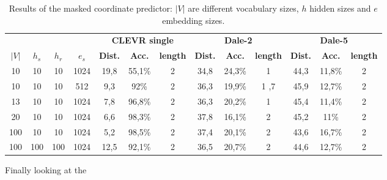 \begin{table}[h]
    \centering
    \begin{tabular}{cccc|ccc|ccc|ccc}
        \toprule
              &         &          &         & \multicolumn{3}{c}{\textbf{CLEVR single}} & \multicolumn{3}{c}{\textbf{Dale-2}} & \multicolumn{3}{c}{\textbf{Dale-5}}                                                                                                       \\\cmidrule(lr){5-7}\cmidrule(lr){8-10}\cmidrule(lr){11-13}
        $|V|$ & $h_{s}$ & $h_{r}$  & $e_{s}$ & \textbf{Dist.}                            & \textbf{Acc.}                       & \textbf{length}                     & \textbf{Dist.} & \textbf{Acc.} & \textbf{length} & \textbf{Dist.} & \textbf{Acc.} & \textbf{length} \\\midrule
        {10}  & {10}    & {10}     & {1024}  & {19,8}                                    & {55,1\%}                            & {2}                                 & {34,8}         & {24,3\%}      & {1}             & {44,3}         & {11,8\%}      & {2}             \\
        {10}  & {10}    & {10}     & {512}   & {9,3}                                     & {92\%}                              & {2}                                 & {36,3}         & {19,9\%}      & {1
        ,7}   & {45,9}  & {12,7\%} & {2}                                                                                                                                                                                                                                   \\
        {13}  & {10}    & {10}     & {1024}  & {7,8}                                     & {96,8\%}                            & {2}                                 & {36,3}         & {20,2\%}      & {1}             & {45,4}         & {11,4\%}      & {2}             \\
        {20}  & {10}    & {10}     & {1024}  & {6,6}                                     & {98,3\%}                            & {2}                                 & {37,8}         & {16,1\%}      & {2}             & {45,2}         & {11\%}        & {2}             \\
        {100} & {10}    & {10}     & {1024}  & {5,2}                                     & {98,5\%}                            & {2}                                 & {37,4}         & {20,1\%}      & {2}             & {43,6}         & {16,7\%}      & {2}             \\
        {100} & {100}   & {100}    & {1024}  & {12,5}                                    & {92,1\%}                            & {2}                                 & {36,5}         & {20,7\%}      & {2}             & {44,6}         & {12,7\%}      & {2}             \\
        \bottomrule
    \end{tabular}
    \caption{Results of the masked coordinate predictor: $|V|$ are different vocabulary sizes, $h$ hidden sizes and $e$ embedding sizes.}
    \label{tab:results_masked_predictor_game}

    Finally looking at the
\end{table}